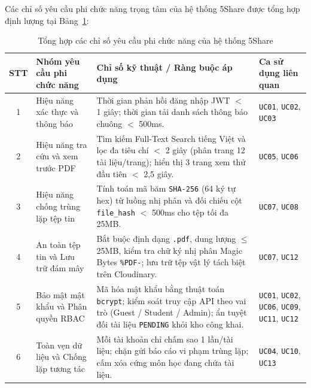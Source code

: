 Các chỉ số yêu cầu phi chức năng trọng tâm của hệ thống 5Share được tổng hợp định lượng tại Bảng~\ref{tab:nfr_summary}:

\begin{table}[H]
\centering
\footnotesize\linespread{1.05}\selectfont
\setlength{\tabcolsep}{5pt}
\renewcommand{\arraystretch}{1.12}
\begin{tabularx}{\textwidth}{|c|p{3.6cm}|X|p{2.8cm}|}
\hline
\rowcolor[HTML]{EAEAEA}
\textbf{STT} & \textbf{Nhóm yêu cầu phi chức năng} & \textbf{Chỉ số kỹ thuật / Ràng buộc áp dụng} & \textbf{Ca sử dụng liên quan} \\
\hline
1 & Hiệu năng xác thực và thông báo & Thời gian phản hồi đăng nhập JWT $<$ 1 giây; thời gian tải danh sách thông báo chuông $<$ 500ms. & \texttt{UC01}, \texttt{UC02}, \texttt{UC03} \\
\hline
2 & Hiệu năng tra cứu và xem trước PDF & Tìm kiếm Full-Text Search tiếng Việt và lọc đa tiêu chí $<$ 2 giây (phân trang 12 tài liệu/trang); hiển thị 3 trang xem thử đầu tiên $<$ 2,5 giây. & \texttt{UC05}, \texttt{UC06} \\
\hline
3 & Hiệu năng chống trùng lặp tệp tin & Tính toán mã băm \texttt{SHA-256} (64 ký tự hex) từ luồng nhị phân và đối chiếu cột \texttt{file\_hash} $<$ 500ms cho tệp tối đa 25MB. & \texttt{UC07}, \texttt{UC08} \\
\hline
4 & An toàn tệp tin và Lưu trữ đám mây & Bắt buộc định dạng \texttt{.pdf}, dung lượng $\le$ 25MB, kiểm tra chữ ký nhị phân Magic Bytes \texttt{\%PDF-}; lưu trữ tệp vật lý tách biệt trên Cloudinary. & \texttt{UC07}, \texttt{UC12} \\
\hline
5 & Bảo mật mật khẩu và Phân quyền RBAC & Mã hóa mật khẩu bằng thuật toán \texttt{bcrypt}; kiểm soát truy cập API theo vai trò (Guest / Student / Admin); ẩn tuyệt đối tài liệu \texttt{PENDING} khỏi kho công khai. & \texttt{UC01}, \texttt{UC02}, \texttt{UC06}, \texttt{UC09}, \texttt{UC11}, \texttt{UC12} \\
\hline
6 & Toàn vẹn dữ liệu và Chống lặp tương tác & Mỗi tài khoản chỉ chấm sao 1 lần/tài liệu; chặn gửi báo cáo vi phạm trùng lặp; cấm xóa cứng môn học đang chứa tài liệu. & \texttt{UC04}, \texttt{UC10}, \texttt{UC13} \\
\hline
\end{tabularx}
\caption{Tổng hợp các chỉ số yêu cầu phi chức năng của hệ thống 5Share}
\label{tab:nfr_summary}
\end{table}
